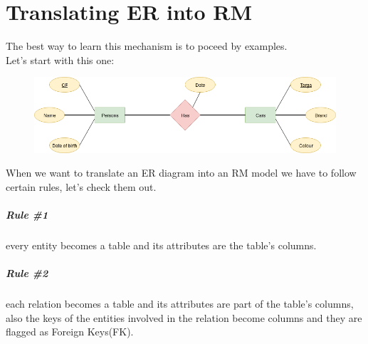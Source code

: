 \documentclass[class=book, crop=false, oneside]{standalone}
\begin{document}
\chapter*{Translating ER into RM}
The best way to learn this mechanism is to poceed by examples.\\
Let's start with this one:

\begin{figure}[H]
	\centering
	\includegraphics[width=.9\textwidth,keepaspectratio]{diagram1.png}
	\caption{}
	\label{diagram1}
\end{figure}

When we want to translate an ER diagram into an RM model we have to follow certain rules, let's check them out.
\paragraph*{Rule \#1} every entity becomes a table and its attributes are the table's columns.
\paragraph*{Rule \#2} each relation becomes a table and its attributes are part of the table's columns, also the keys of the entities involved in the relation become columns and they are flagged as Foreign Keys(FK).
\end{document}
